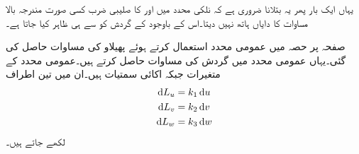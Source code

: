 یہاں ایک بار پھر یہ بتلانا ضروری ہے کہ نلکی محدد میں  اور  کا صلیبی ضرب کسی صورت مندرجہ بالا مساوات کا دایاں ہاتھ نہیں دیتا۔اس کے باوجود  کے  گردش کو  سے ہی ظاہر کیا جاتا ہے۔ 

صفحہ  پر حصہ  میں عمومی محدد استعمال کرتے ہوئے پھیلاو کی مساوات حاصل کی گئی۔یہاں عمومی محدد میں گردش کی مساوات حاصل کرتے ہیں۔عمومی محدد کے متغیرات  جبکہ اکائی سمتیات  ہیں۔ان میں تین اطراف
\begin{align*}
\dif L_u &= k_1 \dif u \\
\dif L_v &= k_2 \dif v \\
\dif L_w &= k_3 \dif w 
\end{align*}
لکھے جاتے ہیں۔

